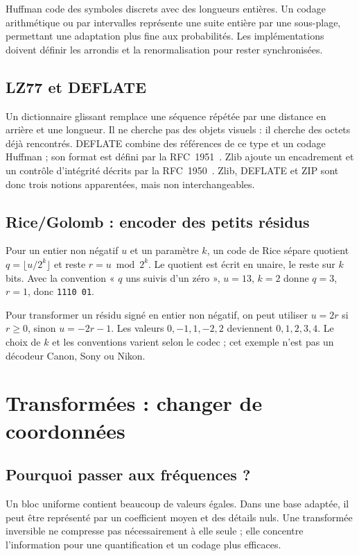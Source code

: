 Huffman code des symboles discrets avec des longueurs entières.
Un codage arithmétique ou par intervalles représente une suite
entière par une sous-plage, permettant une adaptation plus fine
aux probabilités. Les implémentations doivent définir les
arrondis et la renormalisation pour rester synchronisées.

\subsection{LZ77 et DEFLATE}
Un dictionnaire glissant remplace une séquence répétée par une
distance en arrière et une longueur. Il ne cherche pas des
objets visuels : il cherche des octets déjà rencontrés.
DEFLATE combine des références de ce type et un codage Huffman ;
son format est défini par la RFC~1951~\cite{deflate}.
Zlib ajoute un encadrement et un contrôle d'intégrité décrits
par la RFC~1950~\cite{zlib}. Zlib, DEFLATE et ZIP sont donc
trois notions apparentées, mais non interchangeables.

\subsection{Rice/Golomb : encoder des petits résidus}
Pour un entier non négatif $u$ et un paramètre $k$, un code de
Rice sépare quotient $q=\lfloor u/2^k\rfloor$ et reste
$r=u\bmod2^k$. Le quotient est écrit en unaire, le reste sur
$k$ bits. Avec la convention « $q$ uns suivis d'un zéro »,
$u=13$, $k=2$ donne $q=3$, $r=1$, donc \texttt{1110 01}.

Pour transformer un résidu signé en entier non négatif, on peut
utiliser $u=2r$ si $r\ge0$, sinon $u=-2r-1$. Les valeurs
$0,-1,1,-2,2$ deviennent $0,1,2,3,4$. Le choix de $k$ et les
conventions varient selon le codec ; cet exemple n'est pas un
décodeur Canon, Sony ou Nikon.

\section{Transformées : changer de coordonnées}
\subsection{Pourquoi passer aux fréquences ?}
Un bloc uniforme contient beaucoup de valeurs égales. Dans une
base adaptée, il peut être représenté par un coefficient moyen
et des détails nuls. Une transformée inversible ne compresse
pas nécessairement à elle seule ; elle concentre l'information
pour une quantification et un codage plus efficaces.

